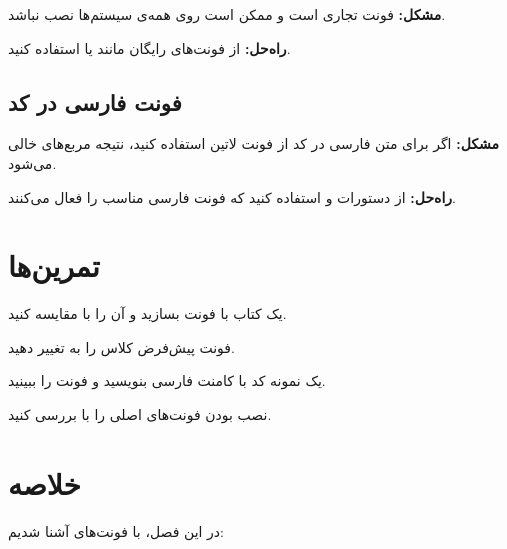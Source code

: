 \textbf{مشکل:} فونت  تجاری
است و ممکن است روی همه‌ی سیستم‌ها نصب
نباشد.

\textbf{راه‌حل:} از فونت‌های رایگان مانند
 یا 
استفاده کنید.

\subsection{فونت فارسی در کد}
\label{sec:fonts-mistake-persian-code}

\textbf{مشکل:} اگر برای متن فارسی در کد از
فونت لاتین استفاده کنید، نتیجه مربع‌های
خالی می‌شود.

\textbf{راه‌حل:} از دستورات  و
 استفاده کنید که فونت فارسی
مناسب را فعال می‌کنند.

\section{تمرین‌ها}
\label{sec:fonts-exercises}

\begin{exercise}
    یک کتاب با فونت  بسازید و
    آن را با  مقایسه کنید.
    \label{exc:fonts-vazirmatn}
\end{exercise}

\begin{exercise}
    فونت پیش‌فرض کلاس را به 
    تغییر دهید.
    \label{exc:fonts-default}
\end{exercise}

\begin{exercise}
    یک نمونه کد با کامنت فارسی بنویسید و
    فونت  را ببینید.
    \label{exc:fonts-code}
\end{exercise}

\begin{exercise}
    نصب بودن فونت‌های اصلی را با 
    بررسی کنید.
    \label{exc:fonts-check}
\end{exercise}

\section{خلاصه}
\label{sec:fonts-summary}

در این فصل، با فونت‌های 
آشنا شدیم:

